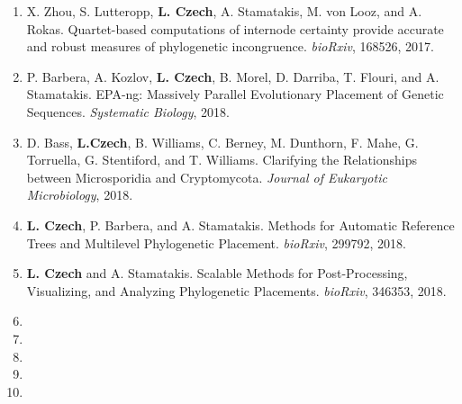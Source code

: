 \begin{enumerate}
    \item X. Zhou, S. Lutteropp, \textbf{L. Czech}, A. Stamatakis, M. von Looz, and A. Rokas.
        Quartet-based computations of internode certainty provide accurate and robust measures of phylogenetic incongruence.
        \textit{bioRxiv}, 168526, 2017. \cite{Zhou2017}

    \item P. Barbera, A. Kozlov, \textbf{L. Czech}, B. Morel, D. Darriba, T. Flouri, and A. Stamatakis.
        EPA-ng: Massively Parallel Evolutionary Placement of Genetic Sequences.
        \textit{Systematic Biology}, 2018. \cite{Barbera2018}

    \item D. Bass, \textbf{L.Czech}, B. Williams, C. Berney, M. Dunthorn, F. Mahe, G. Torruella, G. Stentiford, and T. Williams.
        Clarifying the Relationships between Microsporidia and Cryptomycota.
        \textit{Journal of Eukaryotic Microbiology}, 2018.~\cite{Bass2018a}

    \item \textbf{L. Czech}, P. Barbera, and A. Stamatakis.
        Methods for Automatic Reference Trees and Multilevel Phylogenetic Placement.
        \textit{bioRxiv}, 299792, 2018. \cite{Czech2018}

    \item \textbf{L. Czech} and A. Stamatakis.
        Scalable Methods for Post-Processing, Visualizing, and Analyzing Phylogenetic Placements.
        \textit{bioRxiv}, 346353, 2018. \cite{Czech2018a}

    \item {}
    \item {}
    \item {}
    \item {}
    \item {}
\end{enumerate}

\clearpage
